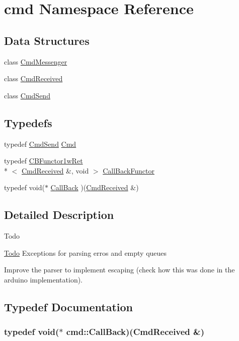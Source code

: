 \hypertarget{namespacecmd}{\section{cmd Namespace Reference}
\label{namespacecmd}
}
\subsection*{Data Structures}
\begin{DoxyCompactItemize}
\item 
class \hyperlink{classcmd_1_1_cmd_messenger}{Cmd\+Messenger}
\item 
class \hyperlink{classcmd_1_1_cmd_received}{Cmd\+Received}
\item 
class \hyperlink{classcmd_1_1_cmd_send}{Cmd\+Send}
\end{DoxyCompactItemize}
\subsection*{Typedefs}
\begin{DoxyCompactItemize}
\item 
typedef \hyperlink{classcmd_1_1_cmd_send}{Cmd\+Send} \hyperlink{namespacecmd_af9b58ca395c80edd1335e21d1b9f4c99}{Cmd}
\item 
typedef \hyperlink{class_c_b_functor1w_ret}{C\+B\+Functor1w\+Ret}\\*
$<$ \hyperlink{classcmd_1_1_cmd_received}{Cmd\+Received} \&, void $>$ \hyperlink{namespacecmd_a24926dd0c7587e1961fd9ebe0259beea}{Call\+Back\+Functor}
\item 
typedef void($\ast$ \hyperlink{namespacecmd_a20b40ecd3ba46130eef6c125f70c4121}{Call\+Back} )(\hyperlink{classcmd_1_1_cmd_received}{Cmd\+Received} \&)
\end{DoxyCompactItemize}


\subsection{Detailed Description}
\begin{DoxyRefDesc}{Todo}
\item[\hyperlink{todo__todo000002}{Todo}]Exceptions for parsing erros and empty queues 

Improve the parser to implement escaping (check how this was done in the arduino implementation). \end{DoxyRefDesc}


\subsection{Typedef Documentation}
\hypertarget{namespacecmd_a20b40ecd3ba46130eef6c125f70c4121}{
\subsubsection[{Call\+Back}]{\setlength{\rightskip}{0pt plus 5cm}typedef void($\ast$ cmd\+::\+Call\+Back)({\bf Cmd\+Received} \&)}}\label{namespacecmd_a20b40ecd3ba46130eef6c125f70c4121}


